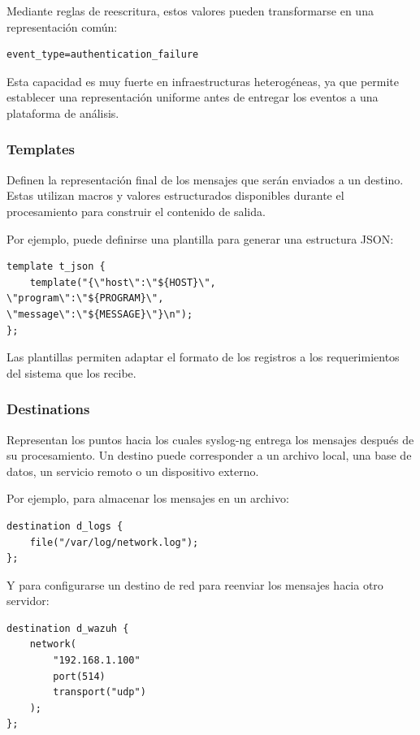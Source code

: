Mediante reglas de reescritura, estos valores pueden transformarse en una representación común:

\begin{lstlisting}[style=logstyle]
event_type=authentication_failure
\end{lstlisting}

Esta capacidad es muy fuerte en infraestructuras heterogéneas, ya que permite establecer una representación uniforme antes de entregar los eventos a una plataforma de análisis.

\subsubsection{Templates}
Definen la representación final de los mensajes
que serán enviados a un destino. Estas utilizan macros y valores estructurados disponibles durante el procesamiento para construir el contenido de salida.

Por ejemplo, puede definirse una plantilla para generar una estructura JSON:

\begin{lstlisting}[style=logstyle]
template t_json {
    template("{\"host\":\"${HOST}\",
\"program\":\"${PROGRAM}\",
\"message\":\"${MESSAGE}\"}\n");
};
\end{lstlisting}

Las plantillas permiten adaptar el formato de los registros a los requerimientos del sistema que los recibe.

\subsubsection{Destinations}

Representan los puntos hacia los cuales syslog-ng entrega los mensajes después de su procesamiento. Un destino puede corresponder a un archivo local, una base de datos, un servicio remoto o un dispositivo externo.

Por ejemplo, para almacenar los mensajes en un archivo:

\begin{lstlisting}[style=logstyle]
destination d_logs {
    file("/var/log/network.log");
};
\end{lstlisting}

Y para configurarse un destino de red para reenviar los mensajes hacia otro servidor:

\begin{lstlisting}[style=logstyle]
destination d_wazuh {
    network(
        "192.168.1.100"
        port(514)
        transport("udp")
    );
};
\end{lstlisting}

